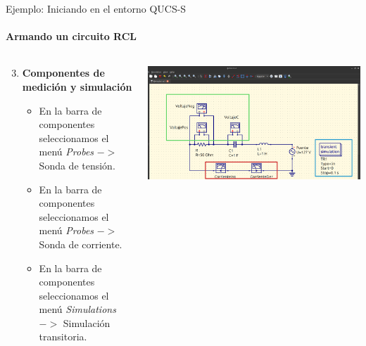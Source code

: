 \documentclass{beamer}
\begin{document}
\begin{frame}[fragile]{Ejemplo: Iniciando en el entorno QUCS-S}
  \framesubtitle{Armando un circuito RCL}

  \begin{columns}[T]
    \begin{column}{0.5\textwidth}
      \begin{enumerate}
        \setcounter{enumi}{2} %
        \item \textbf{Componentes de medición y simulación}
          \begin{itemize}
            \item En la barra de componentes seleccionamos el menú \textit{Probes} $->$ Sonda de tensión. 
            \item En la barra de componentes seleccionamos el menú \textit{Probes} $->$ Sonda de corriente. 
            \item En la barra de componentes seleccionamos el menú \textit{Simulations} $->$ Simulación transitoria. 
          \end{itemize}
      \end{enumerate}
    \end{column}

    \begin{column}{0.5\textwidth}
      \includegraphics[width=\columnwidth]{Imagenes/Circ.png}
    \end{column}
  \end{columns}
\end{frame}
\end{document}
